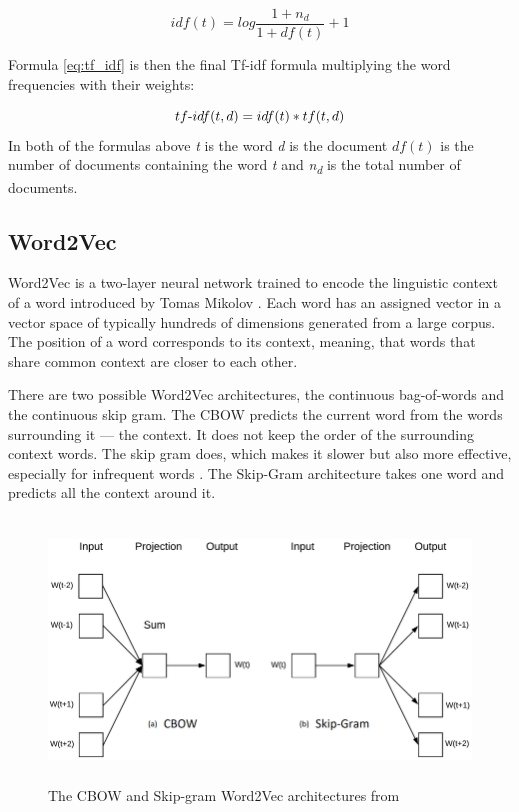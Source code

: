 \begin{equation}
idf(t) = log\frac{1+n_d}{1+df(t)} + 1
\end{equation}

Formula \ref{eq:tf_idf} is then the final Tf-idf formula multiplying the word frequencies with their weights:

\begin{equation}\label{eq:tf_idf}
tf\textnormal{-}idf(t,d) = idf(t)*tf(t,d) 
\end{equation}
In both of the formulas above \textit{t} is the word \textit{d} is the document $ df(t) $ is the number of documents containing the word \textit{t} and \textit{n\textsubscript{d}} is the total number of documents. 

\subsection{Word2Vec}
Word2Vec is a two-layer neural network trained to encode the linguistic context of a word introduced by Tomas Mikolov \cite{DBLP:journals/corr/abs-1301-3781}. Each word has an assigned vector in a vector space of typically hundreds of dimensions generated from a large corpus. The position of a word corresponds to its context, meaning, that words that share common context are closer to each other.

There are two possible Word2Vec architectures, the continuous bag-of-words and the continuous skip gram. The CBOW predicts the current word from the words surrounding it --- the context. It does not keep the order of the surrounding context words. The skip gram does, which makes it slower but also more effective, especially for infrequent words \cite{DBLP:journals/corr/abs-1301-3781}. The Skip-Gram architecture takes one word and predicts all the context around it.
\begin{figure}[h]
    \centering
	\includegraphics[height=70mm]{./img/cbow_skipgram_w2v_architecture.png}
	\caption{The CBOW and Skip-gram Word2Vec architectures from \cite{phdthesis}}
	\label{fig:cbow_skipgram_w2v_architecture}
\end{figure}


